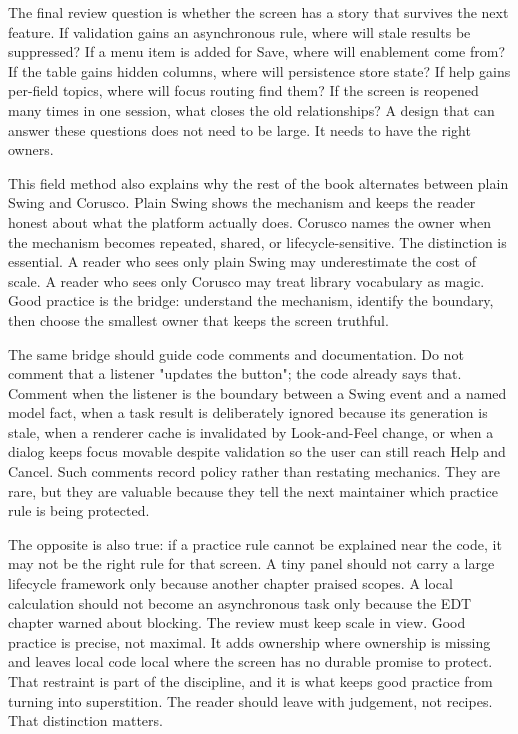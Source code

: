 The final review question is whether the screen has a story that survives the
next feature. If validation gains an asynchronous rule, where will stale
results be suppressed? If a menu item is added for Save, where will enablement
come from? If the table gains hidden columns, where will persistence store
state? If help gains per-field topics, where will focus routing find them? If
the screen is reopened many times in one session, what closes the old
relationships? A design that can answer these questions does not need to be
large. It needs to have the right owners.

This field method also explains why the rest of the book alternates between
plain Swing and Corusco. Plain Swing shows the mechanism and keeps the reader
honest about what the platform actually does. Corusco names the owner when the
mechanism becomes repeated, shared, or lifecycle-sensitive. The distinction is
essential. A reader who sees only plain Swing may underestimate the cost of
scale. A reader who sees only Corusco may treat library vocabulary as magic.
Good practice is the bridge: understand the mechanism, identify the boundary,
then choose the smallest owner that keeps the screen truthful.

The same bridge should guide code comments and documentation. Do not comment
that a listener "updates the button"; the code already says that. Comment when
the listener is the boundary between a Swing event and a named model fact, when
a task result is deliberately ignored because its generation is stale, when a
renderer cache is invalidated by Look-and-Feel change, or when a dialog keeps
focus movable despite validation so the user can still reach Help and Cancel.
Such comments record policy rather than restating mechanics. They are rare, but
they are valuable because they tell the next maintainer which practice rule is
being protected.

The opposite is also true: if a practice rule cannot be explained near the
code, it may not be the right rule for that screen. A tiny panel should not
carry a large lifecycle framework only because another chapter praised scopes.
A local calculation should not become an asynchronous task only because the EDT
chapter warned about blocking. The review must keep scale in view. Good
practice is precise, not maximal. It adds ownership where ownership is missing
and leaves local code local where the screen has no durable promise to protect.
That restraint is part of the discipline, and it is what keeps good practice
from turning into superstition.
The reader should leave with judgement, not recipes.
That distinction matters.

